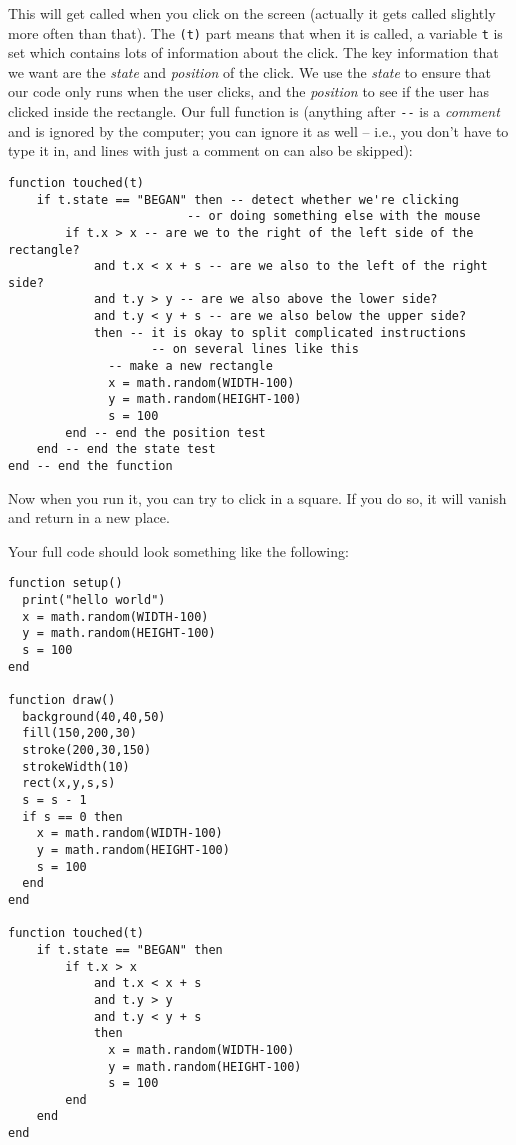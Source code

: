 \documentclass[
  xhtml,%
  use filename%
]{internet}
\begin{document}
This will get called when you click on the screen (actually it gets called slightly more often than that).
The \verb+(t)+ part means that when it is called, a variable \verb+t+ is set which contains lots of information about the click.
The key information that we want are the \emph{state} and \emph{position} of the click.
We use the \emph{state} to ensure that our code only runs when the user clicks, and the \emph{position} to see if the user has clicked inside the rectangle.
Our full function is (anything after \verb+--+ is a \emph{comment} and is ignored by the computer; you can ignore it as well -- i.e., you don't have to type it in, and lines with just a comment on can also be skipped):

\begin{verbatim}
function touched(t)
    if t.state == "BEGAN" then -- detect whether we're clicking
                         -- or doing something else with the mouse
        if t.x > x -- are we to the right of the left side of the rectangle?
            and t.x < x + s -- are we also to the left of the right side?
            and t.y > y -- are we also above the lower side?
            and t.y < y + s -- are we also below the upper side?
            then -- it is okay to split complicated instructions
                    -- on several lines like this
              -- make a new rectangle
              x = math.random(WIDTH-100)
              y = math.random(HEIGHT-100)
              s = 100
        end -- end the position test
    end -- end the state test
end -- end the function
\end{verbatim}

Now when you run it, you can try to click in a square.
If you do so, it will vanish and return in a new place.

Your full code should look something like the following:

\begin{verbatim}
function setup()
  print("hello world")
  x = math.random(WIDTH-100)
  y = math.random(HEIGHT-100)
  s = 100
end

function draw()
  background(40,40,50)
  fill(150,200,30)
  stroke(200,30,150)
  strokeWidth(10)
  rect(x,y,s,s)
  s = s - 1
  if s == 0 then
    x = math.random(WIDTH-100)
    y = math.random(HEIGHT-100)
    s = 100
  end
end

function touched(t)
    if t.state == "BEGAN" then
        if t.x > x
            and t.x < x + s
            and t.y > y
            and t.y < y + s
            then
              x = math.random(WIDTH-100)
              y = math.random(HEIGHT-100)
              s = 100
        end
    end
end
\end{verbatim}
\end{document}
